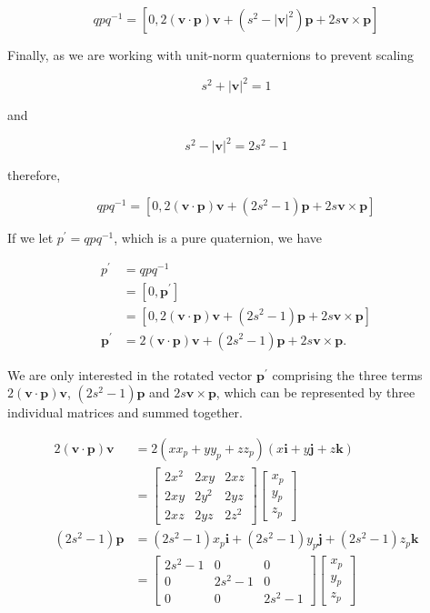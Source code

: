 $$
q p q^{-1}=\left[0,2(\mathbf{v} \cdot \mathbf{p}) \mathbf{v}+\left(s^{2}-|\mathbf{v}|^{2}\right) \mathbf{p}+2 s \mathbf{v} \times \mathbf{p}\right]
$$

Finally, as we are working with unit-norm quaternions to prevent scaling

$$
s^{2}+|\mathbf{v}|^{2}=1
$$

and

$$
s^{2}-|\mathbf{v}|^{2}=2 s^{2}-1
$$

therefore,

$$
q p q^{-1}=\left[0,2(\mathbf{v} \cdot \mathbf{p}) \mathbf{v}+\left(2 s^{2}-1\right) \mathbf{p}+2 s \mathbf{v} \times \mathbf{p}\right]
$$

If we let $p^{\prime}=q p q^{-1}$, which is a pure quaternion, we have

$$
\begin{aligned}
p^{\prime} & =q p q^{-1} \\
& =\left[0, \mathbf{p}^{\prime}\right] \\
& =\left[0,2(\mathbf{v} \cdot \mathbf{p}) \mathbf{v}+\left(2 s^{2}-1\right) \mathbf{p}+2 s \mathbf{v} \times \mathbf{p}\right] \\
\mathbf{p}^{\prime} & =2(\mathbf{v} \cdot \mathbf{p}) \mathbf{v}+\left(2 s^{2}-1\right) \mathbf{p}+2 s \mathbf{v} \times \mathbf{p} .
\end{aligned}
$$

We are only interested in the rotated vector $\mathbf{p}^{\prime}$ comprising the three terms $2(\mathbf{v} \cdot \mathbf{p}) \mathbf{v}$, $\left(2 s^{2}-1\right) \mathbf{p}$ and $2 s \mathbf{v} \times \mathbf{p}$, which can be represented by three individual matrices and summed together.

$$
\begin{aligned}
2(\mathbf{v} \cdot \mathbf{p}) \mathbf{v} & =2\left(x x_{p}+y y_{p}+z z_{p}\right)(x \mathbf{i}+y \mathbf{j}+z \mathbf{k}) \\
& =\left[\begin{array}{lll}
2 x^{2} & 2 x y & 2 x z \\
2 x y & 2 y^{2} & 2 y z \\
2 x z & 2 y z & 2 z^{2}
\end{array}\right]\left[\begin{array}{l}
x_{p} \\
y_{p} \\
z_{p}
\end{array}\right] \\
\left(2 s^{2}-1\right) \mathbf{p} & =\left(2 s^{2}-1\right) x_{p} \mathbf{i}+\left(2 s^{2}-1\right) y_{p} \mathbf{j}+\left(2 s^{2}-1\right) z_{p} \mathbf{k} \\
& =\left[\begin{array}{ccc}
2 s^{2}-1 & 0 & 0 \\
0 & 2 s^{2}-1 & 0 \\
0 & 0 & 2 s^{2}-1
\end{array}\right]\left[\begin{array}{l}
x_{p} \\
y_{p} \\
z_{p}
\end{array}\right]
\end{aligned}
$$


